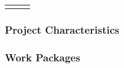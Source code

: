 \documentclass[
  11pt,
]{article}
\begin{document}
\begin{longtable}[c]{|p{1.00in}|p{0.60in}|p{5.00in}}
\noalign{\global\setlength{\arrayrulewidth}{2pt}}\arrayrulecolor[HTML]{666666}\cline{1-3}

\end{longtable}

\hypertarget{project-characteristics}{%
\subsubsection{Project Characteristics}\label{project-characteristics}}

\hypertarget{work-packages}{%
\subsubsection{Work Packages}\label{work-packages}}

\providecommand{\docline}[3]{\noalign{\global\setlength{\arrayrulewidth}{#1}}\arrayrulecolor[HTML]{#2}\cline{#3}}

\setlength{\tabcolsep}{2pt}

\renewcommand*{\arraystretch}{1.5}
\end{document}
